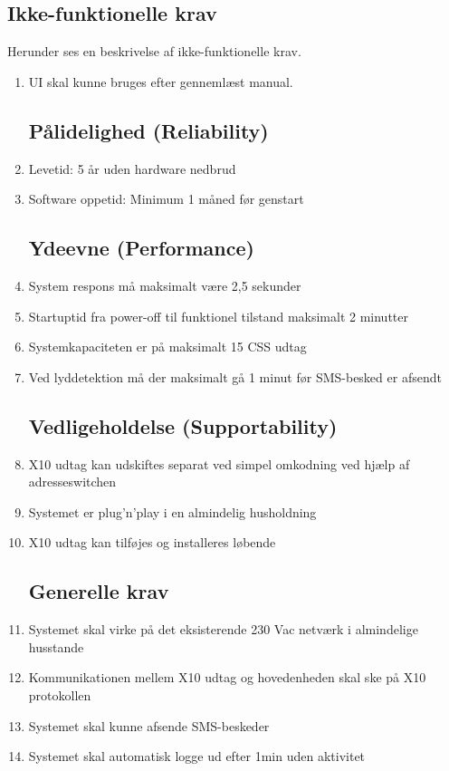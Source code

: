 \subsection*{Ikke-funktionelle krav}
Herunder ses en beskrivelse af ikke-funktionelle krav.

\begin{enumerate}
	\subsection*{Brugbarhed (Usability)}
	\item UI skal kunne bruges efter gennemlæst manual.


	\subsection*{Pålidelighed (Reliability)}

	\item Levetid: 5 år uden hardware nedbrud
	\item Software oppetid: Minimum 1 måned før genstart


	\subsection*{Ydeevne (Performance)}
	\item System respons må maksimalt være 2,5 sekunder
	\item Startuptid fra power-off til funktionel tilstand maksimalt 2 minutter
	\item Systemkapaciteten er på maksimalt 15 CSS udtag
	\item Ved lyddetektion må der maksimalt gå 1 minut før SMS-besked er afsendt

	\subsection*{Vedligeholdelse (Supportability)}
	\item X10 udtag kan udskiftes separat ved simpel omkodning ved hjælp af adresseswitchen 
	\item Systemet er plug’n’play i en almindelig husholdning
	\item X10 udtag kan tilføjes og installeres løbende

\subsection*{Generelle krav}
	\item Systemet skal virke på det eksisterende 230 Vac netværk i almindelige husstande
	\item Kommunikationen mellem X10 udtag og hovedenheden skal ske på X10 protokollen
	\item Systemet skal kunne afsende SMS-beskeder
	\item Systemet skal automatisk logge ud efter 1min uden aktivitet


\end{enumerate}
